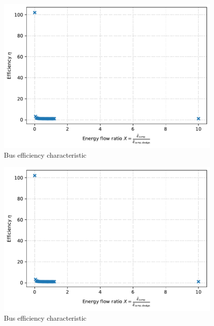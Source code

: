 \begin{minipage}{0.5\textwidth}
\begin{figure}[H]\begin{center}
\includegraphics[width=\textwidth]{figures/Bus_CharLine_pumpoffdesign.pdf}
\caption{Bus efficiency characteristic}
\label{fig:Bus_CharLine_pumpoffdesign}
\end{center}\end{figure}

\end{minipage}
\begin{minipage}{0.5\textwidth}
\begin{figure}[H]\begin{center}
\includegraphics[width=\textwidth]{figures/Bus_CharLine_district_heating_pumpoffdesign.pdf}
\caption{Bus efficiency characteristic}
\label{fig:Bus_CharLine_district heating pumpoffdesign}
\end{center}\end{figure}

\end{minipage}

